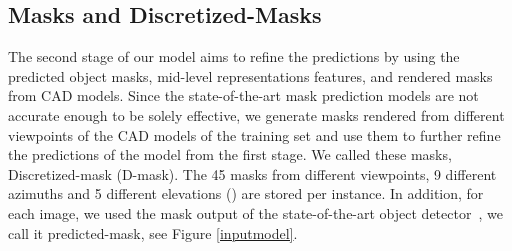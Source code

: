 \documentclass[letterpaper, 10 pt, conference]{ieeeconf}  \pdfoutput=1
\begin{document}
\subsection{Masks and Discretized-Masks}
\label{dmask}
The second stage of our model aims to refine the predictions by using the predicted 
object masks, mid-level representations features, and rendered masks from CAD models.  
Since the state-of-the-art mask prediction models \cite{He2020MaskR,Nie2020Total3DUnderstandingJL} are not accurate enough to be solely effective, we generate masks rendered from different viewpoints of the CAD models of the training set and use them to further refine the predictions of the model from the first stage. We called these masks, Discretized-mask (D-mask). The 45 masks from different viewpoints, 9 different azimuths and 5 different elevations () are stored per instance. In addition, for each image, we used the mask output of the state-of-the-art object detector~\cite{Gkioxari2019MeshR}, we call it predicted-mask, see Figure \ref{inputmodel}.
\end{document}
